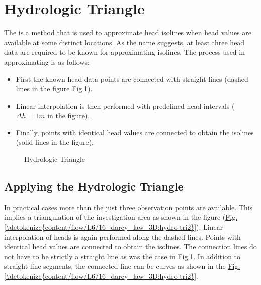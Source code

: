 \documentclass[letterpaper,10pt,english]{jupyterBook}
\begin{document}
\section{Hydrologic Triangle}
\label{\detokenize{content/flow/L6/16_darcy_law_3D:hydrologic-triangle}}
\sphinxAtStartPar
The  is a method that is used to approximate head isolines when head values are available at some distinct locations. As the name suggests, at least three head data are required to be known for approximating isolines. The process used in approximating is as follows:
\begin{itemize}
\item {} 
\sphinxAtStartPar
First the known head data points are connected with straight lines (dashed lines in the figure \hyperref[\detokenize{content/flow/L6/16_darcy_law_3D:hydro-tri}]{Fig.\@ \ref{\detokenize{content/flow/L6/16_darcy_law_3D:hydro-tri}}}).

\item {} 
\sphinxAtStartPar
Linear interpolation is then performed with pre\sphinxhyphen{}defined head intervals (\( \Delta h = 1 m \) in the figure).

\item {} 
\sphinxAtStartPar
Finally, points with identical head values are connected to obtain the isolines (solid lines in the figure).

\end{itemize}

\begin{figure}[htbp]
\centering
\capstart

\noindent{}
\caption{Hydrologic Triangle}\label{\detokenize{content/flow/L6/16_darcy_law_3D:hydro-tri}}\end{figure}


\subsection{Applying the Hydrologic Triangle}
\label{\detokenize{content/flow/L6/16_darcy_law_3D:applying-the-hydrologic-triangle}}
\sphinxAtStartPar
In practical cases more than the just three observation points are available. This implies a triangulation of the investigation area as shown in the figure (\hyperref[\detokenize{content/flow/L6/16_darcy_law_3D:hydro-tri2}]{Fig.\@ \ref{\detokenize{content/flow/L6/16_darcy_law_3D:hydro-tri2}}}). Linear interpolation of heads is again performed along the dashed lines. Points with identical head values are connected to obtain the isolines. The connection lines do not have to be strictly a straight line as was the case in \hyperref[\detokenize{content/flow/L6/16_darcy_law_3D:hydro-tri}]{Fig.\@ \ref{\detokenize{content/flow/L6/16_darcy_law_3D:hydro-tri}}}. In addition to straight line segments, the connected line can be  curves as shown in the \hyperref[\detokenize{content/flow/L6/16_darcy_law_3D:hydro-tri2}]{Fig.\@ \ref{\detokenize{content/flow/L6/16_darcy_law_3D:hydro-tri2}}}.
\end{document}
